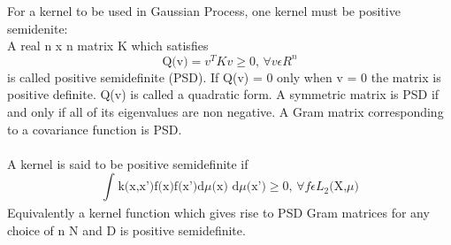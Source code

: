 \documentclass{article}
\begin{document}
	For a kernel to be used in Gaussian Process, one kernel must be  positive semidenite:\\
	A real n x n matrix K which satisfies 
	\begin{equation}\label{eq:psd_mat}
		\text{Q(v)} = v^{T}Kv \geq 0 \text{, } \forall v  \epsilon R^{n}
	\end{equation}
	is called positive semidefinite (PSD). 
	If Q(v) = 0 only when v = 0 the matrix is positive definite. Q(v) is called a quadratic form. 
	A symmetric matrix is PSD if and only if all of its eigenvalues are non negative. A Gram matrix corresponding to a covariance function is PSD.\\\\

	A kernel is said to be positive semidefinite if 
	\begin{equation}\label{eq:psd_kernel}
		\int_{}^{} \text{k(x,x')f(x)f(x')d}\mu\text{(x) d}\mu\text{(x')} \geq 0 \text{, } \forall f  \epsilon L_{2}\text{(X,}\mu\text{)}
	\end{equation}
	Equivalently a kernel function which gives rise to PSD Gram matrices for any choice of n  N and D is positive semidefinite.\\\\
\end{document}
